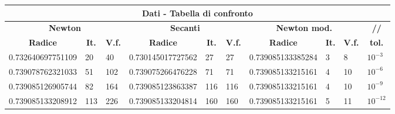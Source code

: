 \documentclass[10pt,a4paper]{article}
\begin{document}
\begin{center}
  \setlength\tabcolsep{2pt}
  \begin{tabular}{|p{3cm} | p{1cm} | p{1cm} | p{3cm} | p{1cm} | p{1cm} | p{3cm} | p{1cm} | p{1cm} | p{1cm}|}
    \hline
    \multicolumn{10}{|c|}{\textbf{Dati - Tabella di confronto}}                                                                                                                                                               \\
    \hline
    \multicolumn{3}{|c|}{\textbf{Newton}} & \multicolumn{3}{|c|}{\textbf{Secanti}} & \multicolumn{3}{|c|}{\textbf{Newton mod.}}
                                          & \multicolumn{1}{c|}{\textbf{//}}                                                                                                                                                  \\
    \hline
    \multicolumn{1}{|c|}{\textbf{Radice}} & \multicolumn{1}{|c|}{\textbf{It.}}     & \multicolumn{1}{|c|}{\textbf{V.f.}}
                                          & \multicolumn{1}{|c|}{\textbf{Radice}}  & \multicolumn{1}{|c|}{\textbf{It.}}         & \multicolumn{1}{|c|}{\textbf{V.f.}}
                                          & \multicolumn{1}{|c|}{\textbf{Radice}}  & \multicolumn{1}{|c|}{\textbf{It.}}         & \multicolumn{1}{|c|}{\textbf{V.f.}}
                                          & \multicolumn{1}{c|}{\textbf{tol.}}                                                                                                                                                \\
    \hline
    0.732640697751109                     & 20                                     & 40                                         & 0.730145017727562                   & 27  & 27  & 0.739085133385284 & 3 & 8  & $ 10^{-3} $  \\
    0.739078762321033                     & 51                                     & 102                                        & 0.739075266476228                   & 71  & 71  & 0.739085133215161 & 4 & 10 & $ 10^{-6} $  \\
    0.739085126905744                     & 82                                     & 164                                        & 0.739085123863387                   & 116 & 116 & 0.739085133215161 & 4 & 10 & $ 10^{-9} $  \\
    0.739085133208912                     & 113                                    & 226                                        & 0.739085133204814                   & 160 & 160 & 0.739085133215161 & 5 & 11 & $ 10^{-12} $ \\
    \hline
  \end{tabular}
  \newline
\end{center}
\end{document}
